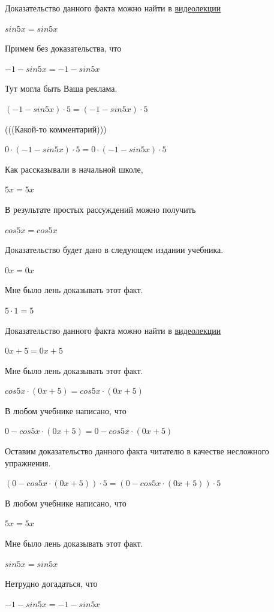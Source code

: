 \documentclass[12pt,a4paper,fleqn]{article}
\theoremstyle{definition}
\begin{document}
Доказательство данного факта можно найти в \href{https://www.youtube.com/watch?v=dQw4w9WgXcQ}{видеолекции} 

$sin 5  x  = sin 5  x $

Примем без доказательства, что 

$ -1  - sin 5  x  =  -1  - sin 5  x $

Тут могла быть Ваша реклама. 

$( -1  - sin 5  x ) \cdot  5  = ( -1  - sin 5  x ) \cdot  5 $

(((Какой-то комментарий))) 

$ 0  \cdot ( -1  - sin 5  x ) \cdot  5  =  0  \cdot ( -1  - sin 5  x ) \cdot  5 $

Как рассказывали в начальной школе, 

$ 5  x  =  5  x $

В результате простых рассуждений можно получить 

$cos 5  x  = cos 5  x $

Доказательство будет дано в следующем издании учебника. 

$ 0  x  =  0  x $

Мне было лень доказывать этот факт.

$ 5  \cdot  1  =  5 $

Доказательство данного факта можно найти в \href{https://www.youtube.com/watch?v=dQw4w9WgXcQ}{видеолекции} 

$ 0  x  +  5  =  0  x  +  5 $

Мне было лень доказывать этот факт.

$cos 5  x  \cdot ( 0  x  +  5 ) = cos 5  x  \cdot ( 0  x  +  5 )$

В любом учебнике написано, что 

$ 0  - cos 5  x  \cdot ( 0  x  +  5 ) =  0  - cos 5  x  \cdot ( 0  x  +  5 )$

Оставим доказательство данного факта читателю в качестве несложного упражнения. 

$( 0  - cos 5  x  \cdot ( 0  x  +  5 )) \cdot  5  = ( 0  - cos 5  x  \cdot ( 0  x  +  5 )) \cdot  5 $

В любом учебнике написано, что 

$ 5  x  =  5  x $

Мне было лень доказывать этот факт.

$sin 5  x  = sin 5  x $

Нетрудно догадаться, что 

$ -1  - sin 5  x  =  -1  - sin 5  x $
\end{document}
